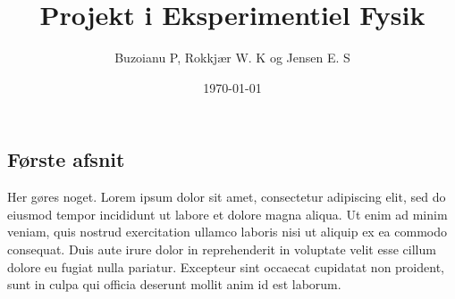 \documentclass{memoir}
\author{Buzoianu P, Rokkjær W. K og Jensen E. S}
\title{Projekt i Eksperimentiel Fysik}
\date{\today}
\begin{document}
  \maketitle
  \subsection*{Første afsnit}
  Her gøres noget.
  Lorem ipsum dolor sit amet, consectetur adipiscing elit, sed do eiusmod tempor incididunt ut labore et dolore magna aliqua. 
  Ut enim ad minim veniam, quis nostrud exercitation ullamco laboris nisi ut aliquip ex ea commodo consequat. 
  Duis aute irure dolor in reprehenderit in voluptate velit esse cillum dolore eu fugiat nulla pariatur. 
  Excepteur sint occaecat cupidatat non proident, sunt in culpa qui officia deserunt mollit anim id est laborum.
\end{document}
